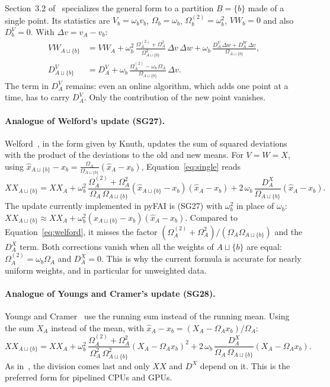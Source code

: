 \documentclass[a4paper,11pt]{article}
\newcommand{\mean}[1]{\widehat{#1}}
\newcommand{\Om}{\Omega}
\newcommand{\OmS}{\Omega^{(2)}}
\newcommand{\D}[2]{D^{#1}_{#2}}
\newcommand{\Ab}{{A\sqcup\{b\}}}
\begin{document}
Section~3.2 of~\cite{SG18} specializes the general form to a partition $B=\{b\}$ made of a single point.
Its statistics are $V_b=\omega_b v_b$, $\Om_b=\omega_b$, $\OmS_b=\omega_b^2$, $VW_b=0$ and also
$\D{V}{b}=0$. With $\Delta v = \mean{v}_A - v_b$:
\begin{align}
  VW_\Ab &= VW_A + \omega_b^2\,\frac{\OmS_A + \Om_A^2}{\Om_\Ab^2}\,\Delta v\,\Delta w
            + \omega_b\,\frac{\D{V}{A}\,\Delta w + \D{W}{A}\,\Delta v}{\Om_\Ab}, \label{eq:single}\\
  \D{V}{\Ab} &= \D{V}{A} + \omega_b\,\frac{\OmS_A - \omega_b\,\Om_A}{\Om_\Ab}\,\Delta v .
\end{align}
The term in $\D{V}{A}$ remains: even an online algorithm, which adds one point at a time, has to carry
$\D{V}{A}$. Only the contribution of the new point vanishes.

\paragraph{Analogue of Welford's update (SG27).} Welford~\cite{Welford62}, in the form given by Knuth, updates the sum of squared deviations with the product of the deviations to the old and new means.
For $V=W=X$, using $\mean{x}_\Ab - x_b = \frac{\Om_A}{\Om_\Ab}(\mean{x}_A - x_b)$, Equation~\eqref{eq:single} reads
\begin{equation}
  XX_\Ab = XX_A + \omega_b^2\,\frac{\OmS_A + \Om_A^2}{\Om_A\,\Om_\Ab}\left(\mean{x}_\Ab - x_b\right)\left(\mean{x}_A - x_b\right)
           + 2\,\omega_b\,\frac{\D{X}{A}}{\Om_\Ab}\left(\mean{x}_A - x_b\right).
  \label{eq:welford}
\end{equation}
The update currently implemented in pyFAI is (SG27) with $\omega_b^2$ in place of $\omega_b$:
$XX_\Ab \approx XX_A + \omega_b^2(\mean{x}_\Ab - x_b)(\mean{x}_A - x_b)$. Compared to
Equation~\eqref{eq:welford}, it misses the factor $(\OmS_A+\Om_A^2)/(\Om_A\Om_\Ab)$ and the $\D{X}{A}$ term.
Both corrections vanish when all the weights of $A\sqcup\{b\}$ are equal: $\OmS_A = \omega_b\Om_A$ and
$\D{X}{A}=0$. This is why the current formula is accurate for nearly uniform weights, and in particular
for unweighted data.

\paragraph{Analogue of Youngs and Cramer's update (SG28).} Youngs and Cramer~\cite{YC71} use the running sum instead of the running mean.
Using the sum $X_A$ instead of the mean, with $\mean{x}_A - x_b = (X_A - \Om_A x_b)/\Om_A$:
\begin{equation}
  XX_\Ab = XX_A + \omega_b^2\,\frac{\OmS_A + \Om_A^2}{\Om_A^2\,\Om_\Ab^2}\left(X_A - \Om_A x_b\right)^2
           + 2\,\omega_b\,\frac{\D{X}{A}}{\Om_A\,\Om_\Ab}\left(X_A - \Om_A x_b\right).
  \label{eq:youngs}
\end{equation}
As in~\cite{SG18}, the division comes last and only $XX$ and $\D{X}{}$ depend on it. This is the
preferred form for pipelined CPUs and GPUs.
\end{document}
